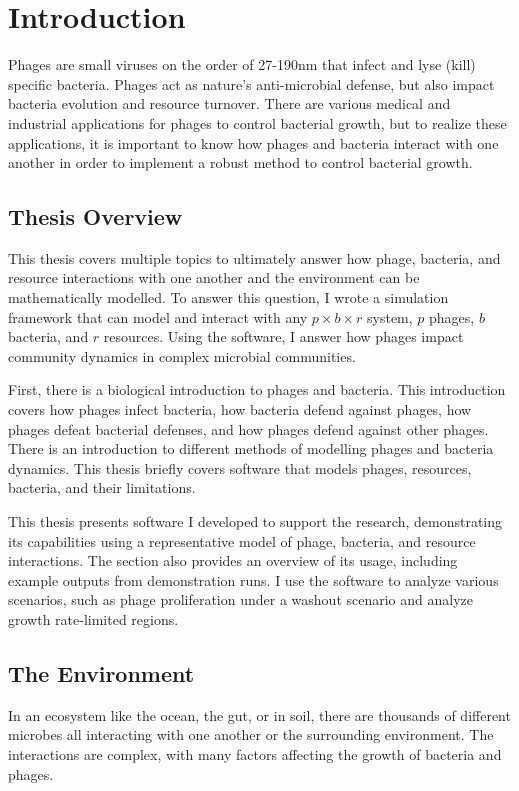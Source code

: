 \chapter{Introduction}
\label{Introduction}

Phages are small viruses on the order of 27-190nm that infect and lyse (kill) specific bacteria. 
Phages act as nature's anti-microbial defense, but also impact bacteria evolution and resource turnover. 
There are various medical and industrial applications for phages to control bacterial growth, but to realize these applications, it is important to know how phages and bacteria interact with one another in order to implement a robust method to control bacterial growth. 

\section{Thesis Overview}
This thesis covers multiple topics to ultimately answer how phage, bacteria, and resource interactions with one another and the environment can be mathematically modelled. 
To answer this question, I wrote a simulation framework that can model and interact with any $p\times b\times r$ system, $p$ phages, $b$ bacteria, and $r$ resources. 
Using the software, I answer how phages impact community dynamics in complex microbial communities. 

First, there is a biological introduction to phages and bacteria. 
This introduction covers how phages infect bacteria, how bacteria defend against phages, how phages defeat bacterial defenses, and how phages defend against other phages. 
There is an introduction to different methods of modelling phages and bacteria dynamics. 
This thesis briefly covers software that models phages, resources, bacteria, and their limitations. 

This thesis presents software I developed to support the research, demonstrating its capabilities using a representative model of phage, bacteria, and resource interactions. 
The section also provides an overview of its usage, including example outputs from demonstration runs.
I use the software to analyze various scenarios, such as phage proliferation under a washout scenario and analyze growth rate-limited regions. 

\section{The Environment}
In an ecosystem like the ocean, the gut, or in soil, there are thousands of different microbes all interacting with one another or the surrounding environment.
The interactions are complex, with many factors affecting the growth of bacteria and phages. 

